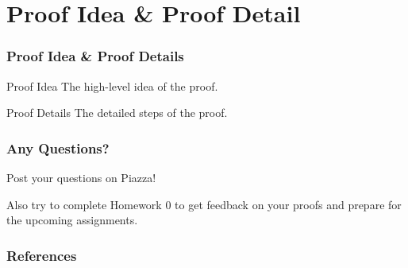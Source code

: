 \documentclass[t]{beamer}
\begin{document}
    \section{Proof Idea \& Proof Detail}


        \begin{frame}
            \frametitle{Proof Idea \& Proof Details}
            \begin{block}{Proof Idea}
                The high-level idea of the proof.
            \end{block}

            \begin{block}{Proof Details}
                The detailed steps of the proof.
            \end{block}
        \end{frame}


    \begin{frame}
        \frametitle{Any Questions?}
        Post your questions on Piazza!

        \bigskip
        Also try to complete Homework 0 to get feedback on your proofs and prepare for the upcoming assignments.
    \end{frame}




    \begin{frame}
        \frametitle{References}
        \printbibliography
    \end{frame}
\end{document}
